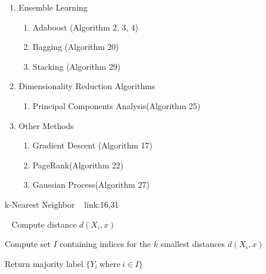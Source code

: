 \documentclass[a4paper]{article}
\begin{document}
\begin{enumerate}
\item Ensemble Learning
\begin{enumerate}
   \item Adaboost (Algorithm 2, 3, 4)
    \item Bagging (Algorithm 20)
   \item Stacking  (Algorithm 29)
   
\end{enumerate}

\item Dimensionality Reduction Algorithms
\begin{enumerate}
\item Principal Components Analysis(Algorithm 25)

\end{enumerate}
\item Other Methods
\begin{enumerate}
   \item Gradient Descent (Algorithm 17)
   \item PageRank(Algorithm 22)
   \item Gaussian Process(Algorithm 27)
  
   
\end{enumerate}

\end{enumerate}


  \begin{algorithm}
 
   \caption{k-Nearest Neighbor  ~ \cite{knearest91} link:{16,31} }
    \begin{algorithmic}[1]
      \
            \State Compute distance $d{(X_i,x)}$
        \EndFor
        
         \State Compute set $I$ containing indices for the $k$ smallest distances $d{(X_i,x)}$
     
       \State Return majority label $\{Y_i \ \text{where}\ i \in I \}$



 \EndFunction
 


\end{algorithmic}
\end{algorithm}
\end{document}
